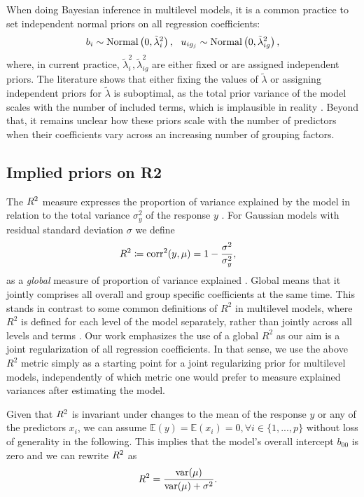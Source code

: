 When doing Bayesian inference in multilevel models, it is a common practice to set independent normal priors on all regression coefficients:
\begin{align}
\label{eq:priorsoncoefs}
	b_i \sim  \text{Normal} \left( 0,  \tilde{\lambda}_i^2   \right) , \ \
	u_{ig_j} \sim  \text{Normal} \left( 0,  \tilde{\lambda}_{ig}^2  \right),
\end{align}
where, in current practice, $\tilde{\lambda}^2_i, \tilde{\lambda}^2_{ig} $ are either fixed or are assigned independent priors. The literature shows that either fixing the values of $\tilde{\lambda}$ or assigning independent priors for $\tilde{\lambda}$ is suboptimal, as the total prior variance of the model scales with the number of included terms, which is implausible in reality \citep{Fulgstad2019}. Beyond that, it remains unclear how these priors scale with the number of predictors when their coefficients vary across an increasing number of grouping factors.

\subsection{Implied priors on R2}

The $R^2$ measure expresses the proportion of variance explained by the model in relation to the total variance $\sigma_y^2$ of the response $y$ \citep{gelmanregstories2020}. For Gaussian models with residual standard deviation $\sigma$ we define
\begin{align}
\label{r2def}
	R^2 &\coloneqq \text{corr}^2(y, \mu)=  1-\frac{\sigma^2}{\sigma_y^2},
\end{align}
as a \textit{global} measure of proportion of variance explained \citep{r2mlmssterba}. Global means that it jointly comprises all overall and group specific coefficients at the same time. This stands in contrast to some common definitions of $R^2$ in multilevel models, where $R^2$ is defined for each level of the model separately, rather than jointly across all levels and terms \citep{r2mlmNakagawa, r2mlmssterba}. Our work emphasizes the use of a global $R^2$ as our aim is a joint regularization of all regression coefficients. In that sense, we use the above $R^2$ metric simply as a starting point for a joint regularizing prior for multilevel models, independently of which metric one would prefer to measure explained variances after estimating the model.

 Given that $R^2$ is invariant under changes to the mean of the response $y$ or any of the predictors $x_i$, we can assume $\mathbb{E}(y)=\mathbb{E}(x_i)=0, \forall i \in \{ 1,..., p\}$ without loss of generality in the following. This implies that the model's overall intercept $b_{00}$ is zero and we can rewrite $R^2$ as
\begin{align}
\label{eq:r2fvarmu} %
	\rsq&= \frac{\var(\mu) }{\var(\mu)+\sigma^2}.
\end{align}

